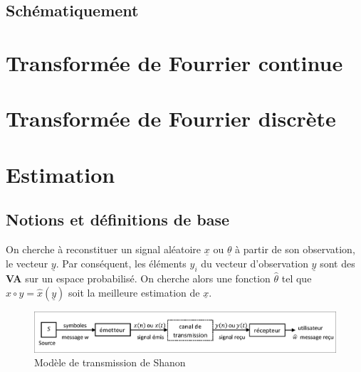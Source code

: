 \subsection{Schématiquement}
\begin{center}
\end{center}
\newpage
\section{Transformée de Fourrier continue}

\section{Transformée de Fourrier discrète}

\newpage
\section{Estimation}
\subsection{Notions et définitions de base}
\noindent On cherche à reconstituer un signal aléatoire $\underline{x}$ ou $\underline{\theta}$ à partir de son observation, le vecteur $\underline{y}$. Par conséquent, les éléments $y_{i}$ du vecteur d'observation $\underline{y}$ sont des \textbf{VA} sur un espace probabilisé. On cherche alors une fonction $\widehat{\theta}$ tel que $x \circ y = \widehat{x}(\underline{y})$ soit la meilleure estimation de $\underline{x}$.
\begin{figure}[hbt!]
    \centering
    \includegraphics[scale=0.425]{Pics/Shanon.png}
    \caption{Modèle de transmission de Shanon}
\end{figure}

